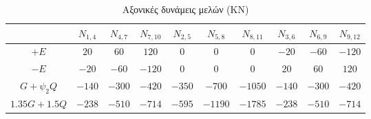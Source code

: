 \begin{landscape}
\begin{table}[h]
\centering\footnotesize
\begin{tabular}{| c || c | c | c | c | c | c | c | c | c |}
\hline
& $N_{1,4}$ & $N_{4,7}$ & $N_{7,10}$ & $N_{2,5}$ & $N_{5,8}$ & $N_{8,11}$ & $N_{3,6}$ & $N_{6,9}$ & $N_{9,12}$ \\
\hline
\hline
$+E$ & $20$ & $60$ & $120$ & $0$ & $0$ & $0$ & $-20$ & $-60$ & $-120$ \\
\hline
$-E$ & $-20$ & $-60$ & $-120$ & $0$ & $0$ & $0$ & $20$ & $60$ & $120$ \\
\hline
$G+\psi_2 Q$ & $-140$ & $-300$ & $-420$ & $-350$ & $-700$ & $-1050$ & $-140$ & $-300$ & $-420$ \\
\hline
$1.35G+1.5Q$ & $-238$ & $-510$ & $-714$ & $-595$ & $-1190$ & $-1785$ & $-238$ & $-510$ & $-714$ \\
\hline
\end{tabular}
\caption{Αξονικές δυνάμεις μελών (\textlatin{KN})}
\label{tab:momentbeams}
\end{table}

\end{landscape}
